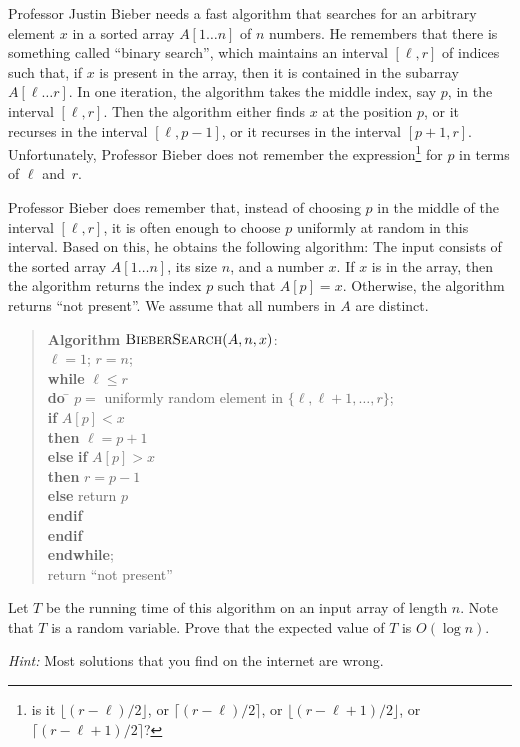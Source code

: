 \documentclass[12pt]{article}
\newcommand{\BS}{\textsf{\sc BieberSearch}}
\newcounter{ques}
\newenvironment{question}{\stepcounter{ques}{\noindent\bf Question \arabic{ques}:}}{\vspace{5mm}}
\begin{document}
\begin{question}
Professor Justin Bieber needs a fast algorithm that searches for an 
arbitrary element $x$ in a sorted array $A[1 \ldots n]$ of $n$ numbers. 
He remembers that there is something called ``binary search'', 
which maintains an interval $[\ell,r]$ of indices such that, if 
$x$ is present in the array, then it is contained in the subarray 
$A[\ell \ldots r]$. In one iteration, the algorithm takes the 
middle index, say $p$, in the interval $[\ell,r]$. Then the 
algorithm either finds $x$ at the position $p$, or it recurses in 
the interval $[\ell,p-1]$, or it recurses in the interval 
$[p+1,r]$. Unfortunately, Professor Bieber does not remember the 
expression\footnote{is it 
$\lfloor (r - \ell)/2 \rfloor$, or 
$\lceil (r - \ell)/2 \rceil$, or 
$\lfloor (r - \ell +1)/2 \rfloor$, or 
$\lceil (r - \ell +1)/2 \rceil$? 
}
for $p$ in terms of $\ell$ and~$r$. 

Professor Bieber does remember that, instead of choosing $p$ in the 
middle of the interval $[\ell,r]$, it is often enough to choose $p$ 
uniformly at random in this interval. Based on this, he obtains the 
following algorithm: The input consists of the sorted array 
$A[1 \ldots n]$, its size $n$, and a number $x$. If $x$ is in the array, 
then the algorithm returns the index $p$ such that $A[p]=x$. Otherwise, 
the algorithm returns ``not present''. We assume that all numbers in 
$A$ are distinct. 

\newpage 

\begin{quote}
\begin{tabbing}
{\bf Algorithm} $\BS(A,n,x)$:  \\
$\ell = 1$; $r = n$; \\
{\bf while} $\ell \leq r$ \\
{\bf do} \= $p=$ uniformly random element in
            $\{\ell,\ell+1,\ldots,r\}$; \\
         \> {\bf if} $A[p]<x$ \\
         \> {\bf then} $\ell = p+1$ \\
         \> {\bf else} \= {\bf if} $A[p]>x$ \\
         \>            \> {\bf then} $r=p-1$ \\
         \>            \> {\bf else} return $p$ \\
         \>            \> {\bf endif} \\
         \> {\bf endif} \\
{\bf endwhile}; \\
return ``not present''
\end{tabbing}
\end{quote}

Let $T$ be the running time of this algorithm on an input array of 
length $n$. Note that $T$ is a random variable. Prove that the expected 
value of $T$ is $O(\log n)$.

\noindent \emph{Hint:} Most solutions that you find on the internet 
are wrong. 
\end{question}
\end{document}
